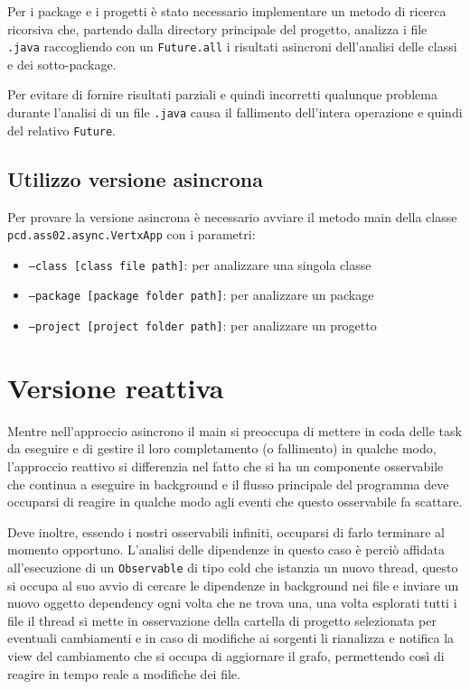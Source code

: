 \documentclass[11pt,notitlepage]{article}
\begin{document}
Per i package e i progetti è stato necessario implementare un metodo di ricerca ricorsiva che, partendo dalla directory principale del progetto, analizza i file \texttt{.java}
raccogliendo con un \texttt{Future.all} i risultati asincroni dell'analisi delle classi e dei sotto-package.

Per evitare di fornire risultati parziali e quindi incorretti qualunque problema durante l'analisi di un file \texttt{.java} causa il fallimento dell'intera operazione 
e quindi del relativo \texttt{Future}.

\subsection{Utilizzo versione asincrona}
Per provare la versione asincrona è necessario avviare il metodo main della classe \texttt{pcd.ass02.async.VertxApp} con i parametri:
\begin{itemize}
    \item \texttt{--class [class file path]}: per analizzare una singola classe
    \item \texttt{--package [package folder path]}: per analizzare un package
    \item \texttt{--project [project folder path]}: per analizzare un progetto
\end{itemize}

\section{Versione reattiva}
Mentre nell'approccio asincrono il main si preoccupa di mettere in coda delle task da eseguire e di gestire il loro completamento (o fallimento) in qualche modo, 
l'approccio reattivo si differenzia nel fatto che si ha un componente osservabile che continua a eseguire in background e il flusso principale del programma deve 
occuparsi di reagire in qualche modo agli eventi che questo osservabile fa scattare. 

Deve inoltre, essendo i nostri osservabili infiniti, occuparsi di farlo terminare al momento opportuno. L'analisi delle dipendenze in questo caso è perciò affidata 
all'esecuzione di un \texttt{Observable} di tipo cold che istanzia un nuovo thread, questo si occupa al suo avvio di cercare le dipendenze in background nei file 
e inviare un nuovo oggetto dependency ogni volta che ne trova una, una volta esplorati tutti i file il thread si mette in osservazione della cartella di progetto
selezionata per eventuali cambiamenti e in caso di modifiche ai sorgenti li rianalizza e notifica la view del cambiamento che si occupa di aggiornare il grafo, 
permettendo così di reagire in tempo reale a modifiche dei file. 
\end{document}
